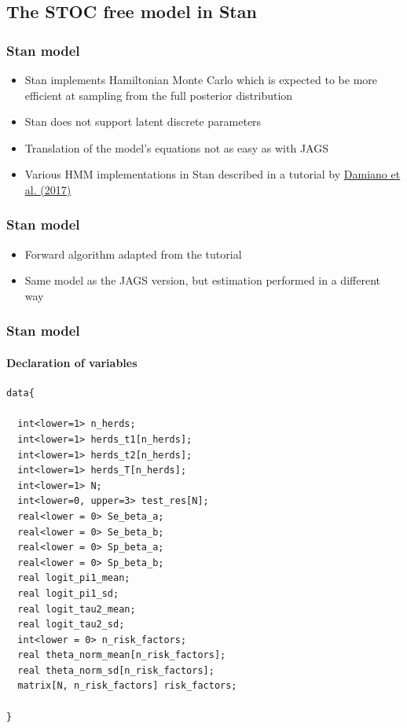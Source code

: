 \documentclass{beamer}
\begin{document}
\subsection[Stan]{The STOC free model in Stan}

\begin{frame}[fragile]
\frametitle{Stan model}
\begin{itemize}
 \item{Stan implements Hamiltonian Monte Carlo which is expected to be more efficient at sampling from the full posterior distribution}
 \item{Stan does not support latent discrete parameters}
 \item{Translation of the model’s equations not as easy as with JAGS}
 \item{Various HMM implementations in Stan described in a tutorial by \href{https://github.com/luisdamiano/stancon18}{Damiano et al. (2017)}}
\end{itemize}
\end{frame}

\begin{frame}
\frametitle{Stan model}
\begin{itemize}
 \item{Forward algorithm adapted from the tutorial}
 \item{Same model as the JAGS version, but estimation performed in a different way}
\end{itemize}
\end{frame}

\begin{frame}[fragile]
\frametitle{Stan model}
\framesubtitle{Declaration of variables}
\scriptsize
\begin{verbatim}
data{

  int<lower=1> n_herds;
  int<lower=1> herds_t1[n_herds];
  int<lower=1> herds_t2[n_herds];
  int<lower=1> herds_T[n_herds];
  int<lower=1> N;
  int<lower=0, upper=3> test_res[N];
  real<lower = 0> Se_beta_a;
  real<lower = 0> Se_beta_b;
  real<lower = 0> Sp_beta_a;
  real<lower = 0> Sp_beta_b;
  real logit_pi1_mean;
  real logit_pi1_sd;
  real logit_tau2_mean;
  real logit_tau2_sd;
  int<lower = 0> n_risk_factors;
  real theta_norm_mean[n_risk_factors];
  real theta_norm_sd[n_risk_factors];
  matrix[N, n_risk_factors] risk_factors;

}
\end{verbatim}
\end{frame}
\end{document}
